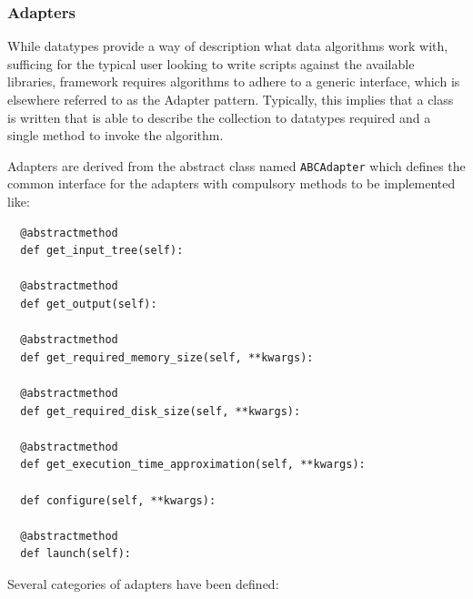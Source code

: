 \subsubsection{Adapters}

While datatypes provide a way of description what data algorithms work with, 
sufficing for the typical user looking to write scripts against the
available libraries, \TVB framework requires algorithms to adhere to 
a generic interface, which is elsewhere referred to as the Adapter pattern.
Typically, this implies that a class is written that is able to describe
the collection to datatypes required and a single method to invoke the
algorithm.

Adapters are derived from the abstract class named \texttt{ABCAdapter} which
defines the common interface for the adapters with compulsory methods to be implemented like:

\begin{lstlisting}
  @abstractmethod
  def get_input_tree(self):

  @abstractmethod
  def get_output(self):

  @abstractmethod
  def get_required_memory_size(self, **kwargs):

  @abstractmethod
  def get_required_disk_size(self, **kwargs):

  @abstractmethod
  def get_execution_time_approximation(self, **kwargs):

  def configure(self, **kwargs):

  @abstractmethod
  def launch(self):
\end{lstlisting}

Several categories of adapters have been defined: 

